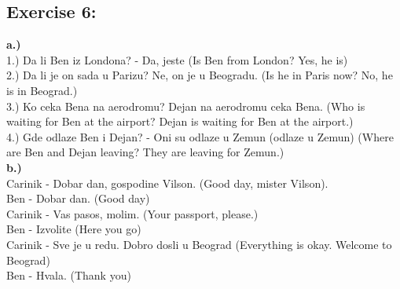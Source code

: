 \documentclass[12pt,
               a4paper,
               article,
               oneside,
               english,oldfontcommands]{memoir}
\newcommand{\spaze}{\vspace{4mm}\\}
\begin{document}
  \subsection*{Exercise 6:} 
  \textbf{a.)} \spaze
 	1.) Da li Ben iz Londona? - Da, jeste (Is Ben from London? Yes, he is) \spaze 
 	2.) Da li je on sada u Parizu? Ne, on je u Beogradu. (Is he in Paris now? No, he is in Beograd.) \spaze 
 	3.) Ko ceka Bena na aerodromu? Dejan na aerodromu ceka Bena. (Who is waiting for Ben at the airport? Dejan is waiting for Ben at the airport.) \spaze 
 	4.) Gde odlaze Ben i Dejan? - Oni su odlaze u Zemun (odlaze u Zemun) (Where are Ben and Dejan leaving? They are leaving for Zemun.) \spaze 
 \textbf{b.)} \spaze 
Carinik - Dobar dan, gospodine Vilson. (Good day, mister Vilson). \spaze
Ben - Dobar dan. (Good day) \spaze 
Carinik - Vas pasos, molim. (Your passport, please.) \spaze 
Ben - Izvolite (Here you go) \spaze 
Carinik - Sve je u redu. Dobro dosli u Beograd (Everything is okay. Welcome to Beograd) \spaze 
Ben - Hvala. (Thank you)
\end{document}

